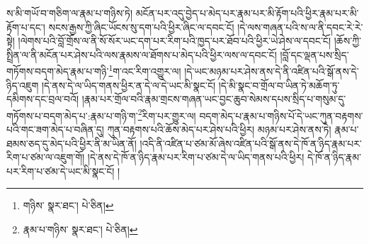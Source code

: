 ས་མི་གཡོ་བ་གཅིག་ལ་རྣམ་པ་གཉིས་ཏེ། མངོན་པར་འདུ་བྱེད་པ་མེད་པར་རྣམ་པར་མི་རྟོག་པའི་ཕྱིར་རྣམ་པར་མི་རྟོག་པ་དང་། སངས་རྒྱས་ཀྱི་ཞིང་ཡོངས་སུ་དག་པའི་ཕྱིར་ཞིང་ལ་དབང་ངོ། །དེ་ལས་གཞན་པའི་ས་ལ་ནི་དབང་རེ་རེ་སྟེ། །ལེགས་པའི་བློ་གྲོས་ལ་ནི་སོ་སོར་ཡང་དག་པར་རིག་པའི་ཁྱད་པར་ཐོབ་པའི་ཕྱིར་ཡེ་ཤེས་ལ་དབང་ངོ། །ཆོས་ཀྱི་སྤྲིན་ལ་ནི་མངོན་པར་ཤེས་པའི་ལས་རྣམས་ལ་ཐོགས་པ་མེད་པའི་ཕྱིར་ལས་ལ་དབང་ངོ། །བློ་དང་ལྡན་པས་སྲིད་གཏོགས་བདག་མེད་རྣམ་པ་གཉི་\footnote{གཉིས་  སྣར་ཐང་།  པེ་ཅིན། }ག་འང་རིག་འགྱུར་ལ། །དེ་ཡང་མཉམ་པར་ཤེས་ནས་དེ་ནི་འཛིན་པའི་སྒོ་ནས་དེ་ཉིད་འཇུག །དེ་ནས་དེ་ལ་ཡིད་གནས་ཕྱིར་ན་དེ་ལ་དེ་ཡང་མི་སྣང་ངོ། །དེ་མི་སྣང་བ་གྲོལ་བ་ཡིན་ཏེ་མཆོག་ཏུ་དམིགས་དང་བྲལ་བའོ། །རྣམ་པར་གྲོལ་བའི་རྣམ་གྲངས་གཞན་ཡང་བྱང་ཆུབ་སེམས་དཔས་སྲིད་པ་གསུམ་དུ་གཏོགས་པ་བདག་མེད་པ་:རྣམ་པ་གཉི་ག་\footnote{རྣམ་པ་གཉིས་  སྣར་ཐང་།  པེ་ཅིན། }རིག་པར་གྱུར་ལ། བདག་མེད་པ་རྣམ་པ་གཉིས་པོ་དེ་ཡང་ཀུན་བརྟགས་པའི་གང་ཟག་མེད་པ་བཞིན་དུ། ཀུན་བརྟགས་པའི་ཆོས་མེད་པར་ཤེས་པའི་ཕྱིར། མཉམ་པར་ཤེས་ནས་ཏེ། རྣམ་པ་ཐམས་ཅད་དུ་མེད་པའི་ཕྱིར་ནི་མ་ཡིན་ནོ། །འདི་ནི་འཛིན་པ་ཙམ་མོ་ཞེས་འཛིན་པའི་སྒོ་ནས་དེ་ཁོ་ན་ཉིད་རྣམ་པར་རིག་པ་ཙམ་ལ་འཇུག་གོ། །དེ་ནས་དེ་ཁོ་ན་ཉིད་རྣམ་པར་རིག་པ་ཙམ་དེ་ལ་ཡིད་གནས་པའི་ཕྱིར། དེ་ཁོ་ན་ཉིད་རྣམ་པར་རིག་པ་ཙམ་དེ་ཡང་མི་སྣང་ངོ། །
